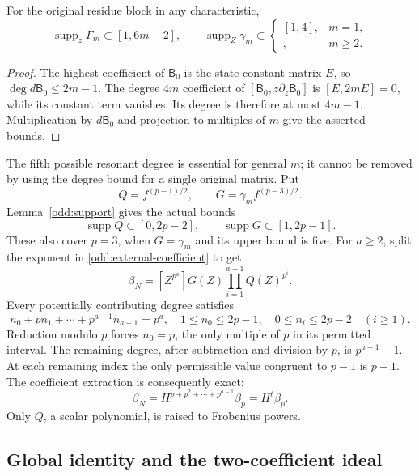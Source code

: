 \begin{lemma}
\label{odd:support}
For the original residue block in any characteristic,
\[
 \operatorname{supp}_z\Gamma_m\subset[1,6m-2],\qquad
 \operatorname{supp}_Z\gamma_m\subset
 \begin{cases}[1,4],&m=1,\\[1,5],&m\ge2.
 \end{cases}
\]
\end{lemma}

\begin{proof}
The highest coefficient of $\mathsf B_0$ is the state-constant
matrix $E$, so $\deg d\mathsf B_0\le2m-1$. The degree $4m$
coefficient of $[\mathsf B_0,z\partial_z\mathsf B_0]$ is
$[E,2mE]=0$, while its constant term vanishes. Its degree is
therefore at most $4m-1$. Multiplication by $d\mathsf B_0$ and
projection to multiples of $m$ give the asserted bounds.
\end{proof}

The fifth possible resonant degree is essential for general $m$;
it cannot be removed by using the degree bound for a single original
matrix. Put
\[
 Q=f^{(p-1)/2},\qquad G=\gamma_m f^{(p-3)/2}.
\]
Lemma~\ref{odd:support} gives the actual bounds
\begin{equation}
 \operatorname{supp}Q\subset[0,2p-2],\qquad
 \operatorname{supp}G\subset[1,2p-1].
 \label{odd:digit-support}
\end{equation}
These also cover $p=3$, when $G=\gamma_m$ and its upper bound is
five. For $a\ge2$, split the exponent in
\eqref{odd:external-coefficient} to get
\[
 \beta_N=[Z^{p^a}]G(Z)\prod_{i=1}^{a-1}Q(Z)^{p^i}.
\]
Every potentially contributing degree satisfies
\[
 n_0+pn_1+\cdots+p^{a-1}n_{a-1}=p^a,
 \quad 1\le n_0\le2p-1,\quad
 0\le n_i\le2p-2\quad(i\ge1).
\]
Reduction modulo $p$ forces $n_0=p$, the only multiple of $p$
in its permitted interval. The remaining degree, after subtraction
and division by $p$, is $p^{a-1}-1$. At each remaining index
the only permissible value congruent to $p-1$ is $p-1$.
The coefficient extraction is consequently exact:
\begin{equation}
 \beta_N=H^{p+p^2+\cdots+p^{a-1}}\beta_p
        =H^\ell\beta_p.
 \label{odd:external-factorisation}
\end{equation}
Only $Q$, a scalar polynomial, is raised to Frobenius powers.

\subsection{Global identity and the two-coefficient ideal}

